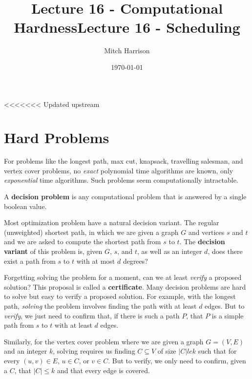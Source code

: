 \documentclass[titlepage, 12pt, leqno]{article}
\title{\Huge{Lecture 16 - Computational Hardness}}
\title{\Huge{Lecture 16 - Scheduling}}
\author{\large{Mitch Harrison}}
\date{\today}
\begin{document}
\setlength{\parskip}{1\baselineskip}
\setlength{\parindent}{15pt}
\maketitle
\tableofcontents
\newpage


<<<<<<< Updated upstream
\section{Hard Problems}

For problems like the longest path, max cut, knapsack, travelling salesman, and
vertex cover problems, no \textit{exact} polynomial time algorithms are known, 
only \textit{exponential} time algorithms. Such problems seem computationally
intractable.

\begin{definition}
    A \textbf{decision problem} is any computational problem that is answered by
    a single boolean value.
\end{definition}

Most optimization problem have a natural decision variant. The regular
(unweighted) shortest path, in which we are given a graph $G$ and vertices $s$
and $t$ and we are asked to compute the shortest path from $s$ to $t$. The
\textbf{decision variant} of this problem is, given $G$, $s$, and $t$, as well
as an integer $d$, does there exist a path from $s$ to $t$ with at most
$d$ degrees?

Forgetting solving the problem for a moment, can we at least \textit{verify}
a proposed solution? This proposal is called a \textbf{certificate}. Many
decision problems are hard to solve but easy to verify a proposed solution. For
example, with the longest path, \textit{solving} the problem involves finding
the path with at least $d$ edges. But to \textit{verify}, we just need to confirm
that, if there is such a path $P$, that $P$ is a simple path from $s$ to $t$ 
with at least $d$ edges.

Similarly, for the vertex cover problem where we are given a graph
$G = (V,E)$ and an integer $k$, solving requires us finding $C \subseteq V$ of
size $|C| le k$ such that for every $(u,v) \in E$, $u \in C$, or $v \in C$. But
to verify, we only need to confirm, given a $C$, that $|C|\le k$ and that
every edge is covered.
\end{document}
